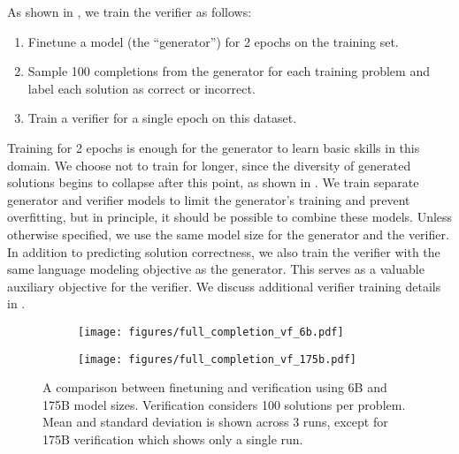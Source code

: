 {As shown in , we train the verifier as follows:

\begin{enumerate}
\item Finetune a model (the “generator”) for 2 epochs on the training set.
\item Sample 100 completions from the generator for each training problem and label each solution as correct or incorrect.
\item Train a verifier for a single epoch on this dataset.
\end{enumerate}

Training for 2 epochs is enough for the generator to learn basic skills in this domain. We choose not to train for longer, since the diversity of generated solutions begins to collapse after this point, as shown in . We train separate generator and verifier models to limit the generator's training and prevent overfitting, but in principle, it should be possible to combine these models. Unless otherwise specified, we use the same model size for the generator and the verifier. In addition to predicting solution correctness, we also train the verifier with the same language modeling objective as the generator. This serves as a valuable auxiliary objective for the verifier. We discuss additional verifier training details in .

\begin{figure}
\centering
\begin{subfigure}{0.475 \textwidth}
\texttt{[image: figures/full\_completion\_vf\_6b.pdf]}
\end{subfigure}
\hspace*{\fill}
\begin{subfigure}{0.475 \textwidth}
\texttt{[image: figures/full\_completion\_vf\_175b.pdf]}
\end{subfigure}
\caption{A comparison between finetuning and verification using 6B and 175B model sizes. Verification considers 100 solutions per problem. Mean and standard deviation is shown across 3 runs, except for 175B verification which shows only a single run.}
\label{fig:full_completion_vf}
\end{figure}

}
